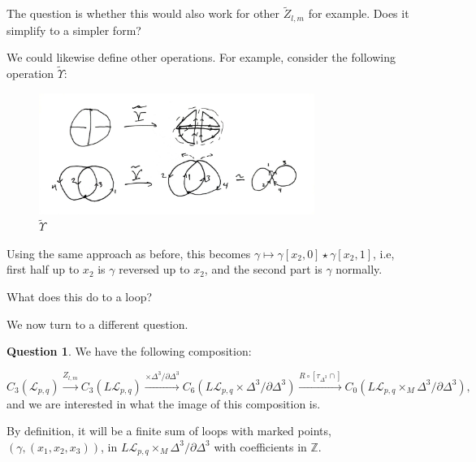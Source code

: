 \documentclass[reqno]{amsart}
\theoremstyle{definition}
\newtheorem{question}[theorem]{Question}
\theoremstyle{remark}
\begin{document}
The question is whether this would also
work for other $\tilde{Z}_{l,m}$ for example. Does
it simplify to a simpler form?

We could likewise define other operations. For example, consider the
following operation
$\tilde{\Upsilon}$:

\begin{figure}[htpb]
    \centering
    \includegraphics[width=0.8\textwidth]{Figures/NUIZKUW.jpeg}
    \caption{$\tilde{\Upsilon}$}
    \label{fig:Figures-NUIZKUW-jpeg}
\end{figure}

Using the same approach as before, this becomes
$\gamma \mapsto \gamma[x_2,0] \star \gamma[x_2, 1]$, i.e,
first half up to $x_2$ is $\gamma$ reversed up to
$x_2$, and the second part is $\gamma$ normally.\\
\linebreak


What does this do to a loop?\\
\linebreak


We now turn to a different question.


\begin{question}
    We have the following composition:

    \[
    C_{3}(\mathcal{L}_{p,q})
    \stackrel{Z_{l,m}}{\to} 
    C_3 \left( L \mathcal{L}_{p,q} \right) 
    \stackrel{\times \Delta^3 / \partial \Delta^3}{\to} 
    C_{6}\left( L \mathcal{L}_{p,q} \times 
    \Delta^3 / \partial \Delta^3 \right) 
    \stackrel{R \circ \left[ \tau_{\Delta^3}\cap \right] }{\to} 
    C_{0} \left( L \mathcal{L}_{p,q} \times_M 
    \Delta^3 / \partial \Delta^3 \right),
    \] 
    and we are interested in what the image of this composition is.
\end{question}

    By definition, it will be a finite sum
    of loops with marked points, $\left( \gamma, \left( x_1,x_2,x_3 \right) 
    \right) $, in
    $L \mathcal{L}_{p,q} \times_M \Delta^3 / \partial \Delta^3$ 
    with coefficients in $\mathbb{Z}$.
\end{document}

